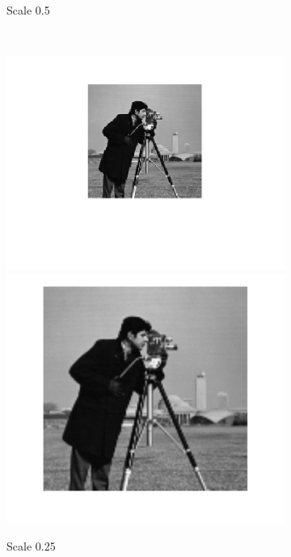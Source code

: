 \documentclass{article}
\begin{document}
\begin{figure}[h!]
\begin{subfigure}[t]{0.3\textwidth}
		\caption{Scale 0.5}
	\end{subfigure}%
	~
	\begin{subfigure}[t]{0.3\textwidth}
		\centering
		\includegraphics[width=\linewidth]{./output_images/DOWN_no_anti-alias_bilinear_scale_0_250000.png}
		\includegraphics[width=\linewidth]{./output_images/UP_no_anti-alias_bilinear_scale_0_250000.png}
		\caption{Scale 0.25}
	\end{subfigure}
	~
	\begin{subfigure}[t]{0.3\textwidth}
		\centering

\end{subfigure}
\end{figure}
\end{document}
